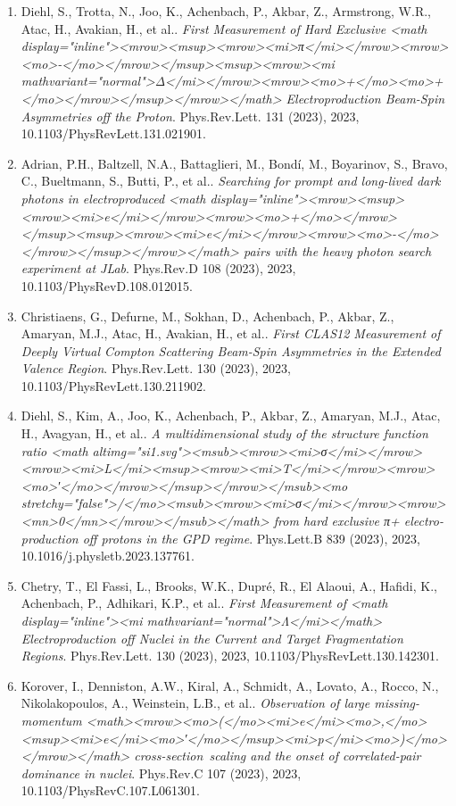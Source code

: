 \begin{enumerate}
\item Diehl, S., Trotta, N., Joo, K., Achenbach, P., Akbar, Z., Armstrong, W.R., Atac, H., Avakian, H., et al.. \textit{First Measurement of Hard Exclusive <math display="inline"><mrow><msup><mrow><mi>π</mi></mrow><mrow><mo>-</mo></mrow></msup><msup><mrow><mi mathvariant="normal">Δ</mi></mrow><mrow><mo>+</mo><mo>+</mo></mrow></msup></mrow></math> Electroproduction Beam-Spin Asymmetries off the Proton}. Phys.Rev.Lett. 131 (2023), 2023, 10.1103/PhysRevLett.131.021901.
\item Adrian, P.H., Baltzell, N.A., Battaglieri, M., Bondí, M., Boyarinov, S., Bravo, C., Bueltmann, S., Butti, P., et al.. \textit{Searching for prompt and long-lived dark photons in electroproduced <math display="inline"><mrow><msup><mrow><mi>e</mi></mrow><mrow><mo>+</mo></mrow></msup><msup><mrow><mi>e</mi></mrow><mrow><mo>-</mo></mrow></msup></mrow></math> pairs with the heavy photon search experiment at JLab}. Phys.Rev.D 108 (2023), 2023, 10.1103/PhysRevD.108.012015.
\item Christiaens, G., Defurne, M., Sokhan, D., Achenbach, P., Akbar, Z., Amaryan, M.J., Atac, H., Avakian, H., et al.. \textit{First CLAS12 Measurement of Deeply Virtual Compton Scattering Beam-Spin Asymmetries in the Extended Valence Region}. Phys.Rev.Lett. 130 (2023), 2023, 10.1103/PhysRevLett.130.211902.
\item Diehl, S., Kim, A., Joo, K., Achenbach, P., Akbar, Z., Amaryan, M.J., Atac, H., Avagyan, H., et al.. \textit{A multidimensional study of the structure function ratio <math altimg="si1.svg"><msub><mrow><mi>σ</mi></mrow><mrow><mi>L</mi><msup><mrow><mi>T</mi></mrow><mrow><mo>′</mo></mrow></msup></mrow></msub><mo stretchy="false">/</mo><msub><mrow><mi>σ</mi></mrow><mrow><mn>0</mn></mrow></msub></math> from hard exclusive π+ electro-production off protons in the GPD regime}. Phys.Lett.B 839 (2023), 2023, 10.1016/j.physletb.2023.137761.
\item Chetry, T., El Fassi, L., Brooks, W.K., Dupré, R., El Alaoui, A., Hafidi, K., Achenbach, P., Adhikari, K.P., et al.. \textit{First Measurement of <math display="inline"><mi mathvariant="normal">Λ</mi></math> Electroproduction off Nuclei in the Current and Target Fragmentation Regions}. Phys.Rev.Lett. 130 (2023), 2023, 10.1103/PhysRevLett.130.142301.
\item Korover, I., Denniston, A.W., Kiral, A., Schmidt, A., Lovato, A., Rocco, N., Nikolakopoulos, A., Weinstein, L.B., et al.. \textit{Observation of large missing-momentum <math><mrow><mo>(</mo><mi>e</mi><mo>,</mo><msup><mi>e</mi><mo>′</mo></msup><mi>p</mi><mo>)</mo></mrow></math> cross-section scaling and the onset of correlated-pair dominance in nuclei}. Phys.Rev.C 107 (2023), 2023, 10.1103/PhysRevC.107.L061301.

\end{enumerate}
